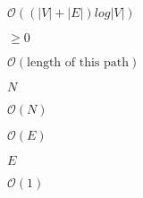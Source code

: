 \documentclass{article}
\begin{document}
$\mathcal{O}((|V| + |E|) log |V|)$
\pagebreak

$\ge 0$
\pagebreak

$\mathcal{O}(\mbox{length of this path})$
\pagebreak

$N$
\pagebreak

$\mathcal{O}(N)$
\pagebreak

$\mathcal{O}(E)$
\pagebreak

$E$
\pagebreak

$\mathcal{O}(1)$
\pagebreak
\end{document}
